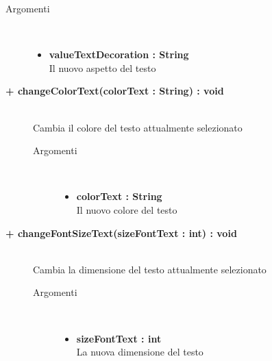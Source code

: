 \begin{description}
\begin{description}
		\begin{description}
			\item[Argomenti] \hfill \\
				\begin{itemize}
				
					\item \textbf{valueTextDecoration : String} \hfill \\
					Il nuovo aspetto del testo
				\end{itemize}
				
		\end{description}
	\end{description}
	
	\begin{description}
		\item[\textbf{\color{blue}+ changeColorText(colorText : String) : void	 	}] \hfill \\
		Cambia il colore del testo attualmente selezionato
			
		\begin{description}
			\item[Argomenti] \hfill \\
				\begin{itemize}
				
					\item \textbf{colorText : String} \hfill \\
					Il nuovo colore del testo
				\end{itemize}
				
		\end{description}
	\end{description}
	
	\begin{description}
		\item[\textbf{\color{blue}+ changeFontSizeText(sizeFontText : int) : void	 	}] \hfill \\
		Cambia la dimensione del testo attualmente selezionato
			
		\begin{description}
			\item[Argomenti] \hfill \\
				\begin{itemize}
				
					\item \textbf{sizeFontText : int} \hfill \\
					La nuova dimensione del testo
				\end{itemize}
				

\end{description}
\end{description}
\end{description}
